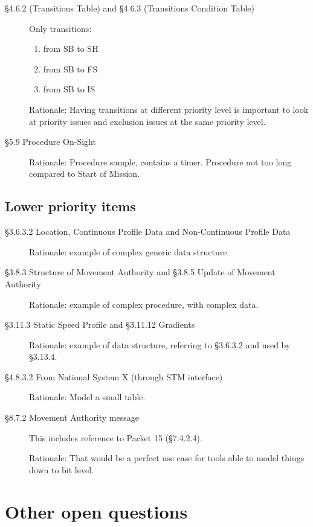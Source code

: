 \documentclass{template/openetcs_article}
\begin{document}
\begin{description}
\item [§4.6.2 (Transitions Table) and §4.6.3 (Transitions Condition
  Table)] Only transitions:
  \begin{enumerate}
  \item from SB to SH
  \item from SB to FS
  \item from SB to IS
  \end{enumerate}

  Rationale: Having transitions at different priority level is
  important to look at priority issues and exclusion issues at the
  same priority level.

\item [§5.9 Procedure On-Sight]

 Rationale: Procedure sample, contains a timer. Procedure not too long
 compared to Start of Mission.

\end{description}

\subsection{Lower priority items}

\begin{description}
\item [§3.6.3.2 Location, Continuous Profile Data and Non-Continuous
  Profile Data]

  Rationale: example of complex generic data structure.

\item [§3.8.3 Structure of Movement Authority and §3.8.5 Update of
  Movement Authority]

  Rationale: example of complex procedure, with complex data.

\item [§3.11.3 Static Speed Profile and §3.11.12 Gradients]

  Rationale: example of data structure, referring to §3.6.3.2 and used
  by §3.13.4.

\item [§4.8.3.2 From National System X (through STM interface)]

  Rationale: Model a small table. 

\item [§8.7.2 Movement Authority message] This includes reference to
  Packet 15 (§7.4.2.4). 

  Rationale: That would be a perfect use case for tools able to model
  things down to bit level.
\end{description}

\section{Other open questions}

\end{document}
